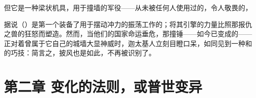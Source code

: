 但它是一种梁状机具，用于撞墙的军役——从未被任何人使用过的，令人敬畏的，\par

\par

据说（）是第一个装备了用于摆动冲力的振荡工作的；将其引擎的力量比照那报仇之兽的狂怒而塑造。然而，当他们的国家命运垂危，那撞锤——如今已变成的——正对着曾属于它自己的城墙大显神威时，迦太基人立刻目瞪口呆，如同见到一种和的巧技：简言之，披风也是如此，不再被识别了。\par


\section{第二章  变化的法则，或普世变异}

